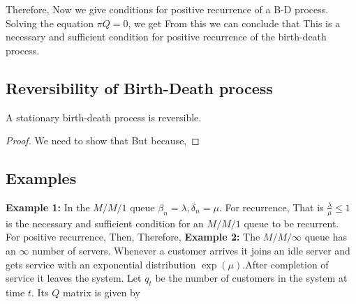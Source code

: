 \documentclass[all-lectures.tex]{subfiles}
\begin{document}
Therefore,
Now we give conditions for positive recurrence of a B-D process.
Solving the equation $\pi Q = 0$, we get
From this we can conclude that
This is a necessary and sufficient condition for positive recurrence of the birth-death process.

\subsection{Reversibility of Birth-Death process}
\begin{prop}
A stationary birth-death process is reversible.
\end{prop}

\begin{proof}
We need to show that 
But
because, 
\end{proof}
\subsection{Examples}
\textbf{Example 1:} In the $M/M/1$ queue $\beta_n = \lambda, \delta_n = \mu$. For recurrence,
That is $\frac{\lambda}{\mu}  \le 1$ is the necessary and sufficient condition for an $M/M/1$ queue to be recurrent.\\


For positive recurrence,
Then,
Therefore,
\textbf{Example 2:} 	The $M/M/\infty$ queue has an $\infty$ number of servers. Whenever a customer arrives it joins an idle server and gets service with an exponential distribution $\exp(\mu)$.After completion of service it leaves the system. 
Let $q_t$ be the number of customers in the system at time $t$.
Its $Q$ matrix is given by
\end{document}
